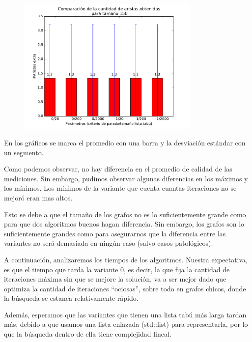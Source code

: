 \begin{figure}[H]
 \centering
	\includegraphics[width=0.8\textwidth]{graficos/problema_6/calidad2.pdf}
	\caption{}
	\label{fig:problema6-calidad2}
\end{figure}

En los gráficos se marca el promedio con una barra y la desviación estándar con un segmento.

Como podemos observar, no hay diferencia en el promedio de calidad de las mediciones.
Sin embargo, pudimos observar algunas diferencias en los máximos y los mínimos. Los mínimos de la variante que cuenta cuantas iteraciones no se mejoró eran mas altos.

Esto se debe a que el tamaño de los grafos no es lo suficientemente grande como para que dos algoritmos buenos hagan diferencia. Sin embargo, los grafos son lo suficientemente grandes como para asegurarnos que la diferencia entre las variantes no será demasiada en ningún caso (salvo casos patológicos).


A continuación, analizaremos los tiempos de los algoritmos. Nuestra expectativa, es que el tiempo que tarda la variante 0, es decir, la que fija la cantidad de iteraciones máxima sin que se mejore la solución, va a ser mejor dado que optimiza la cantidad de iteraciones ``ociosas'', sobre todo en grafos chicos, donde la búsqueda se estanca relativamente rápido.

Además, esperamos que las variantes que tienen una lista tabú más larga tardan más, debido a que usamos una lista enlazada (std::list) para representarla, por lo que la búsqueda dentro de ella tiene complejidad lineal.

